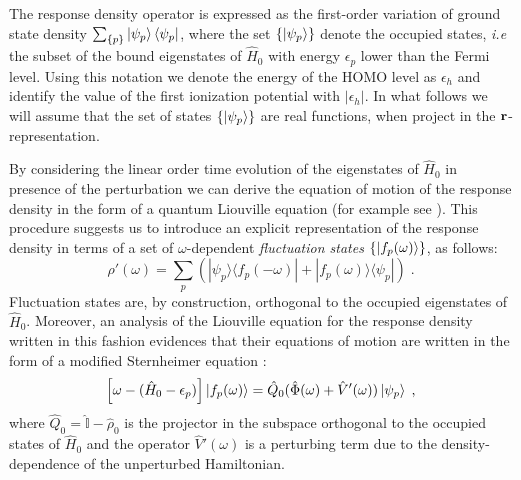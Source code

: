 \documentclass[reprint,aps,prb]{revtex4-1}
\renewcommand{\r}{{\bf r}}
\newcommand{\eps}{\epsilon}
\newcommand{\be}{\begin{equation}}
\newcommand{\ee}{\end{equation}}
\newcommand{\lb}{\label}
\newcommand{\op}[1]{\hat {#1}}
\newcommand{\ketbra}[2]{| #1 \rangle \langle #2 |}
\newcommand{\dmnot}{\op{\rho}_0}
\newcommand{\dm}{\op{\rho}}
\newcommand{\hnot}{\op{H}_0}
\newcommand{\identity}{\op{\mathbb I}}
\begin{document}
The response density operator is expressed as the first-order variation of ground state density $\sum_{\{p\}} \ket{\psi_p} \bra{\psi_p}$,
where the set $\{\ket{\psi_p}\}$ denote the occupied states, \emph{i.e} the subset of the bound eigenstates of $\hnot$ with energy $\eps_p$ lower than the Fermi level.
Using this notation we denote the energy of the HOMO level as $\eps_h$ and identify the value of the first ionization potential with $|\eps_h|$. 
In what follows we will assume that the set of states $\{\ket{\psi_p}\}$ are real functions, when project in the $\r$-representation.  

By considering the linear order time evolution of the eigenstates of $\hnot$ in presence of the perturbation we can derive the equation of motion of the response density in the form of 
a quantum Liouville equation (for example see \cite{baroni2008}). This procedure suggests us to introduce an explicit representation of the response density in terms of a set of 
$\omega$-dependent \emph{fluctuation states} $\{\ket{f_p(\omega)}\}$, as follows: 
\be\lb{rhoPrimeFluctuationStateDef1}
\dm'(\omega) = \sum_p\left(\ketbra{\psi_p}{f_p(-\omega)} + \ketbra{f_p(\omega)}{\psi_p}\right) \;.
\ee
Fluctuation states are, by construction, orthogonal to the occupied eigenstates of $\hnot$. Moreover, an analysis of the Liouville equation for the response density written in this fashion
evidences that their equations of motion are written in the form of a modified Sternheimer equation \cite{mahan1980}:
\be\lb{fluctuationStateEqMotion1}
\left[\omega - (\hnot-\eps_p)\right]\ket{f_p(\omega)} = \op Q_0(\op\Phi(\omega)+\op V'(\omega))\ket{\psi_p} \;,
\ee
where $\op Q_0=\identity-\dmnot$ is the projector in the subspace orthogonal to the occupied states of $\hnot$ and the operator $\op V'(\omega)$ is a perturbing term due to the density-dependence 
of the unperturbed Hamiltonian. %
\end{document}
